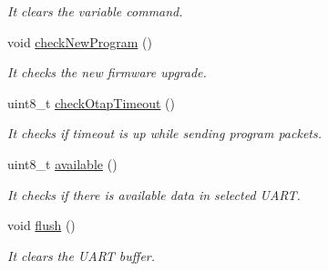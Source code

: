 \begin{DoxyCompactItemize}
\begin{DoxyCompactList}\small\item\em It clears the variable \textquotesingle{}command\textquotesingle{}. \end{DoxyCompactList}\item 
void \hyperlink{class_wasp_x_bee_core_abc7bf692f68763f8f65e272eeefc510b}{check\+New\+Program} ()
\begin{DoxyCompactList}\small\item\em It checks the new firmware upgrade. \end{DoxyCompactList}\item 
uint8\+\_\+t \hyperlink{class_wasp_x_bee_core_af5a53716571155fe4782ae4b0014a5e4}{check\+Otap\+Timeout} ()
\begin{DoxyCompactList}\small\item\em It checks if timeout is up while sending program packets. \end{DoxyCompactList}\item 
uint8\+\_\+t \hyperlink{class_wasp_x_bee_core_acd2b6f6d35a60698f1a124035aa3c050}{available} ()
\begin{DoxyCompactList}\small\item\em It checks if there is available data in selected U\+A\+RT. \end{DoxyCompactList}\item 
void \hyperlink{class_wasp_x_bee_core_a5a407fa3a7ed2cf1186980566a04649d}{flush} ()
\begin{DoxyCompactList}\small\item\em It clears the U\+A\+RT buffer. \end{DoxyCompactList}\end{DoxyCompactItemize}
